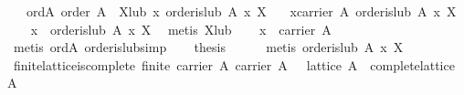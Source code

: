 \begin{isabellebody}
\ \ \ ord{}A{}\ {}order\ A{}\ \ X{}lub{}\ {}{}x{}\ order{}is{}lub\ A\ x\ X{}\isanewline
\ \ \ {}{}x{}carrier\ A{}\ order{}is{}lub\ A\ x\ X{}\isanewline
%
\isadelimproof
%
\endisadelimproof
%
\isatagproof
{}\isamarkupfalse%
\ {}\isanewline
\ \ \isamarkupfalse%
\ x\ \ {}order{}is{}lub\ A\ x\ X{}\ \isamarkupfalse%
\ {}metis\ X{}lub{}\isanewline
\ \ \isamarkupfalse%
\ {}x\ {}\ carrier\ A{}\isanewline
\ \ \ \ \isamarkupfalse%
\ {}metis\ ord{}A\ order{}is{}lub{}simp{}\isanewline
\ \ \isamarkupfalse%
\ {}thesis\isanewline
\ \ \ \ \isamarkupfalse%
\ {}metis\ {}order{}is{}lub\ A\ x\ X{}{}\isanewline
{}\isamarkupfalse%
%
\endisatagproof
{\isafoldproof}%
%
\isadelimproof
\isanewline
%
\endisadelimproof
\isanewline
{}\isamarkupfalse%
\ finite{}lattice{}is{}complete{}\ {}{}finite\ {}carrier\ A{}{}\ carrier\ A\ {}\ {}{}{}\ lattice\ A{}\ {}\ complete{}lattice\ A{}\isanewline

\end{isabellebody}
